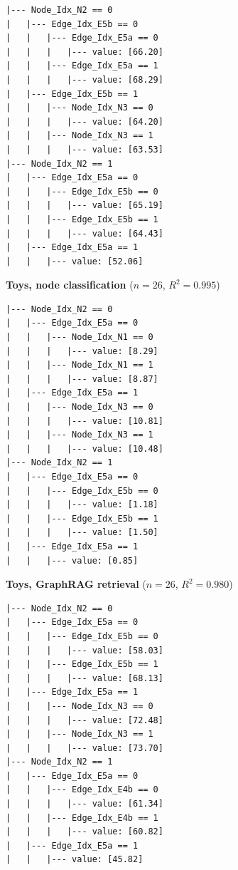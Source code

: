 \begin{figure}[t]
\begin{minipage}[t]{0.48\textwidth}
\begin{verbatim}
|--- Node_Idx_N2 == 0
|   |--- Edge_Idx_E5b == 0
|   |   |--- Edge_Idx_E5a == 0
|   |   |   |--- value: [66.20]
|   |   |--- Edge_Idx_E5a == 1
|   |   |   |--- value: [68.29]
|   |--- Edge_Idx_E5b == 1
|   |   |--- Node_Idx_N3 == 0
|   |   |   |--- value: [64.20]
|   |   |--- Node_Idx_N3 == 1
|   |   |   |--- value: [63.53]
|--- Node_Idx_N2 == 1
|   |--- Edge_Idx_E5a == 0
|   |   |--- Edge_Idx_E5b == 0
|   |   |   |--- value: [65.19]
|   |   |--- Edge_Idx_E5b == 1
|   |   |   |--- value: [64.43]
|   |--- Edge_Idx_E5a == 1
|   |   |--- value: [52.06]
\end{verbatim}
\end{minipage}
\vspace{0.4em}
\begin{minipage}[t]{0.48\textwidth}
\centering\textbf{Toys, node classification} ($n{=}26$, $R^2{=}0.995$)
\begin{verbatim}
|--- Node_Idx_N2 == 0
|   |--- Edge_Idx_E5a == 0
|   |   |--- Node_Idx_N1 == 0
|   |   |   |--- value: [8.29]
|   |   |--- Node_Idx_N1 == 1
|   |   |   |--- value: [8.87]
|   |--- Edge_Idx_E5a == 1
|   |   |--- Node_Idx_N3 == 0
|   |   |   |--- value: [10.81]
|   |   |--- Node_Idx_N3 == 1
|   |   |   |--- value: [10.48]
|--- Node_Idx_N2 == 1
|   |--- Edge_Idx_E5a == 0
|   |   |--- Edge_Idx_E5b == 0
|   |   |   |--- value: [1.18]
|   |   |--- Edge_Idx_E5b == 1
|   |   |   |--- value: [1.50]
|   |--- Edge_Idx_E5a == 1
|   |   |--- value: [0.85]
\end{verbatim}
\end{minipage}
\hfill
\begin{minipage}[t]{0.48\textwidth}
\centering\textbf{Toys, GraphRAG retrieval} ($n{=}26$, $R^2{=}0.980$)
\begin{verbatim}
|--- Node_Idx_N2 == 0
|   |--- Edge_Idx_E5a == 0
|   |   |--- Edge_Idx_E5b == 0
|   |   |   |--- value: [58.03]
|   |   |--- Edge_Idx_E5b == 1
|   |   |   |--- value: [68.13]
|   |--- Edge_Idx_E5a == 1
|   |   |--- Node_Idx_N3 == 0
|   |   |   |--- value: [72.48]
|   |   |--- Node_Idx_N3 == 1
|   |   |   |--- value: [73.70]
|--- Node_Idx_N2 == 1
|   |--- Edge_Idx_E5a == 0
|   |   |--- Edge_Idx_E4b == 0
|   |   |   |--- value: [61.34]
|   |   |--- Edge_Idx_E4b == 1
|   |   |   |--- value: [60.82]
|   |--- Edge_Idx_E5a == 1
|   |   |--- value: [45.82]
\end{verbatim}
\end{minipage}
\vspace{0.4em}
\begin{minipage}[t]{0.48\textwidth}

\end{minipage}
\end{figure}
